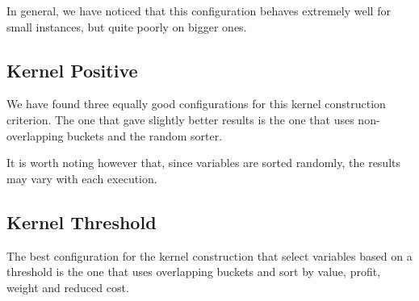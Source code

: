In general, we have noticed that this configuration behaves extremely well for small instances, but quite poorly on bigger ones.

\subsection{Kernel Positive}
We have found three equally good configurations for this kernel construction criterion. The one that gave slightly better results is the one that uses non-overlapping buckets and the random sorter.

It is worth noting however that, since variables are sorted randomly, the results may vary with each execution.

\subsection{Kernel Threshold}
The best configuration for the kernel construction that select variables based on a threshold is the one that uses overlapping buckets and sort by value, profit, weight and reduced cost.
